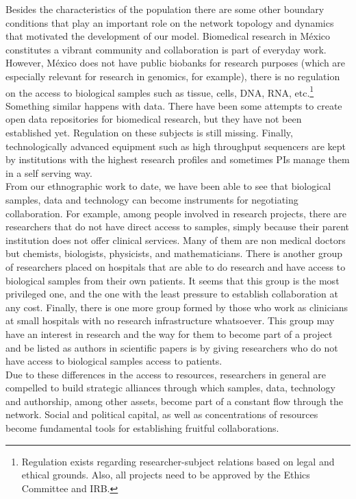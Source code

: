 \documentclass{bmcart}
\begin{document}
Besides the characteristics of the population there are some other boundary
conditions that play an important role on the network topology and dynamics
that motivated the development of our model. Biomedical research in M\'exico
constitutes a vibrant community and collaboration is part of everyday
work. However, M\'exico does not have public biobanks for research purposes
(which are especially relevant for research in genomics, for example), there is
no regulation on the access to biological samples such as tissue, cells, DNA,
RNA, etc.\footnote{Regulation exists regarding researcher-subject relations
  based on legal and ethical grounds. Also, all projects need to be approved by
  the Ethics Committee and IRB.} Something similar happens with data. There have
been some attempts to create open data repositories for biomedical research, but
they have not been established yet. Regulation on these subjects is still
missing. Finally, technologically advanced equipment such as high throughput sequencers
are kept by institutions with the highest research
profiles and sometimes PIs manage them in a self serving way.\\  

From our ethnographic work to date, we have been able to see that
biological samples, data and technology can become instruments for negotiating
collaboration. For example, among people involved in research projects, there
are researchers that do not have direct access to samples, simply because their
parent institution does not offer clinical services. Many of them are non medical
doctors but chemists, biologists, physicists, and mathematicians. There is
another group of researchers placed on hospitals that are able to do
research and have access to biological samples from their own patients. It seems
that this group is the most privileged one, and the one with the least pressure to establish
collaboration at any cost. Finally, there is one more group formed by those
who work as clinicians at small hospitals with no research infrastructure
whatsoever. This group may have an interest in research and the way for them to
become part of a project and be listed as authors in scientific papers is by
giving researchers who do not have access to biological samples access to
patients.\\

Due to these differences in the access to resources, researchers in
general are compelled to build strategic alliances through which samples, data,
technology and authorship, among other assets, become part of a constant flow through
the network. Social and political capital, as well as concentrations of
resources become fundamental tools for establishing fruitful collaborations. 
\end{document}
